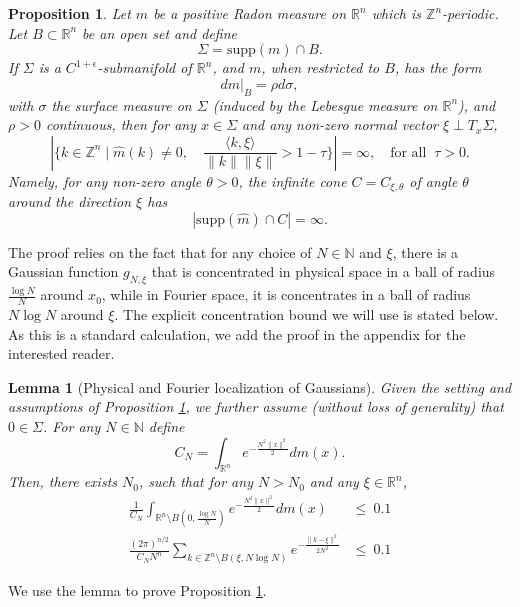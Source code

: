 \documentclass[11pt,letterpaper]{amsart}
\theoremstyle{definition}
\theoremstyle{plain}
\newtheorem{prop}[Def]{Proposition}
\newtheorem{lem}[Def]{Lemma}
\newcommand{\R}{{\mathbb R}}
\newcommand{\N}{{\mathbb N}}
\newcommand{\Z}{{\mathbb Z}}
\begin{document}
\begin{prop}\label{prop:normal}
	Let $m$ be a positive Radon measure on $\R^n$ which is $\Z^n$-periodic. Let $B\subset\R^n$ be an open set and define $$\Sigma=\mathrm{supp}(m)
    \cap B.$$
    If $\Sigma$ is a $C^{1+\epsilon}$-submanifold of $\R^n$, and $m$, when restricted to $B$, has the form
    \[dm|_{B}=\rho d\sigma,\]
    with $\sigma$ the surface measure on $\Sigma$ (induced by the Lebesgue measure on $\R^n$), and $\rho>0$ continuous, then for any $x\in\Sigma$ and any non-zero normal vector $\xi\perp T_{x}\Sigma$,  
\[\left|\{k\in\Z^n\mid \widehat{m}(k)\ne0,\quad \frac{\langle k,\xi\rangle}{\|k\|\|\xi\|}>1-\tau\}\right|=\infty,\quad\text{for all  $\ \tau>0$}.\]
Namely, for any non-zero angle $\theta>0$, the infinite cone $C=C_{\xi,\theta}$ of angle $\theta$ around the direction $\xi$ has
\[ \left|\mathrm{supp}(\widehat{m})\cap C\right|=\infty.\]
\end{prop}	
The proof relies on the fact that for any choice of $N\in\N$ and $\xi$, there is a Gaussian function $g_{N,\xi}$ that is concentrated in physical space in a ball of radius $\frac{\log N}{N}$ around $x_0$, while in Fourier space, it is concentrates in a ball of radius $N\log N$ around $\xi$. The explicit concentration bound we will use is stated below. As this is a standard calculation, we add the proof in the appendix for the interested reader. 
\begin{lem}[Physical and Fourier localization of Gaussians]\label{lem:Gaussian}
	Given the setting and assumptions of Proposition \ref{prop:normal}, we further assume (without loss of generality) that $0\in\Sigma$. For any $N\in \N$ define
    \[C_{N}=\int_{\R^n}e^{-\frac{N^2\|x\|^2}{2}}dm(x).\]
Then, there exists $N_{0}$, such that for any $N>N_{0}$ and any $\xi\in\R^n$,
\begin{align}\label{gaussian 1}
	\frac{1}{C_{N}}\int_{\R^n\setminus B(0,\frac{\log N}{N})}e^{-\frac{N^2\|x\|^2}{2}}dm(x) & \le\ 0.1\\
		\label{gaussian 3}
	\frac{(2\pi)^{n/2}}{C_{N}N^{n}}\sum_{k\in\Z^n\setminus B(\xi,N\log N)}e^{-\frac{\|k-\xi\|^2}{2N^2}} & \le\ 0.1
\end{align}	
\end{lem}
We use the lemma to prove Proposition \ref{prop:normal}.
\end{document}
